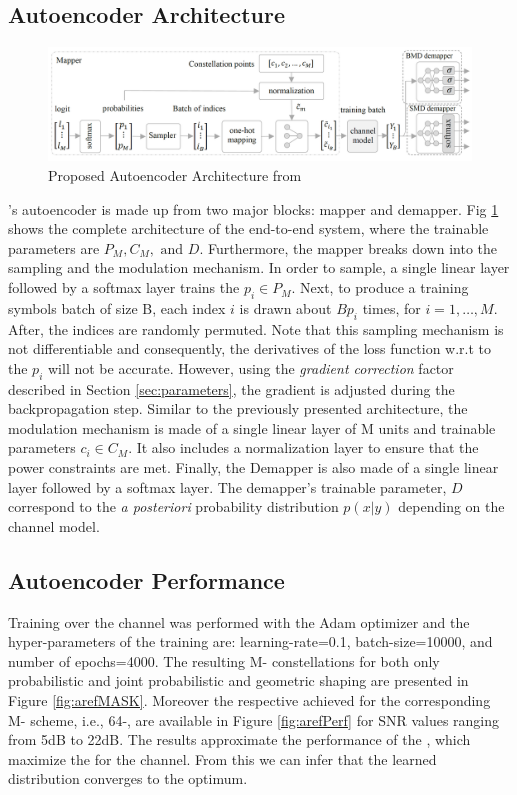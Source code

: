 \subsection{Autoencoder Architecture}
\begin{figure}[H]
	\centering
	\includegraphics[width=\textwidth]{figs/aref_diagram.png}
	\caption{Proposed Autoencoder Architecture from \cite{Aref}}
	\label{fig:arefAe}
\end{figure}

\citeauthor{Aref}'s autoencoder is made up from two major blocks: mapper and demapper. Fig \ref{fig:arefAe} shows the complete architecture of the end-to-end system, where the trainable parameters are $P_M, C_M, \text{ and } D$. Furthermore, the mapper breaks down into the sampling and the modulation mechanism. In order to sample, a single linear layer followed by a softmax layer trains the $p_i \in P_M$. Next, to produce a training symbols batch of size B, each index $i$ is drawn about $Bp_i$ times, for $i = 1, \dots, M$. After, the indices are randomly permuted. Note that this sampling mechanism is not differentiable and consequently, the derivatives of the loss function w.r.t to the $p_i$ will not be accurate. However, using the \textit{gradient correction} factor described in Section \ref{sec:parameters}, the gradient is adjusted during the backpropagation step. Similar to the previously presented architecture, the modulation mechanism is made of a single linear layer of M units and trainable parameters $c_i \in C_M$. It also includes a normalization layer to ensure that the power constraints are met. Finally, the Demapper is also made of a single linear layer followed by a softmax layer. The demapper's trainable parameter, $D$ correspond to the \textit{a posteriori} probability distribution $p(x|y)$ depending on the channel model.

\subsection{Autoencoder Performance}
Training over the  channel was performed with the Adam optimizer and the hyper-parameters of the training are: learning-rate=0.1, batch-size=10000, and number of epochs=4000.
The resulting M- constellations for both only probabilistic and joint probabilistic and geometric shaping are presented in Figure \ref{fig:arefMASK}. Moreover the respective achieved  for the corresponding M- scheme, i.e., 64-, are available in Figure \ref{fig:arefPerf} for SNR values ranging from 5dB to 22dB. The results approximate the performance of the , which maximize the  for the  channel. From this we can infer that the learned distribution converges to the optimum.
\newpage


